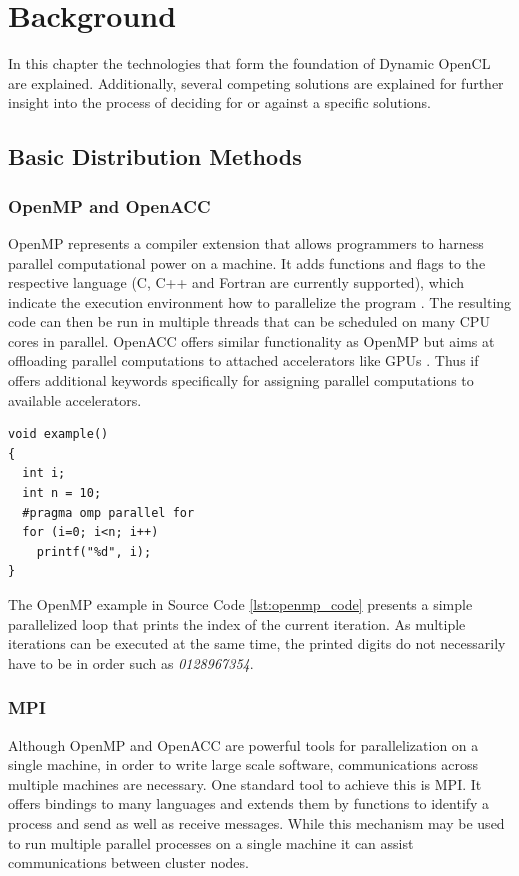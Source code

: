 \chapter{Background}
\label{background}
In this chapter the technologies that form the foundation of Dynamic OpenCL are explained. Additionally, several competing solutions are explained for further insight into the process of deciding for or against a specific solutions.

\section{Basic Distribution Methods}
\label{distribution_basics}

\subsection*{OpenMP and OpenACC}
OpenMP represents a compiler extension that allows programmers to harness parallel computational power on a machine. It adds functions and flags to the respective language (C, C++ and Fortran are currently supported), which indicate the execution environment how to parallelize the program \cite{openmp_spec}. The resulting code can then be run in multiple threads that can be scheduled on many CPU cores in parallel. OpenACC offers similar functionality as OpenMP but aims at offloading parallel computations to attached accelerators like GPUs \cite{openacc_spec}. Thus if offers additional keywords specifically for assigning parallel computations to available accelerators.

\begin{lstlisting}[caption=OpenMP Code Example in C,captionpos=b,label=lst:openmp_code]
void example()
{
  int i;
  int n = 10;
  #pragma omp parallel for
  for (i=0; i<n; i++)
    printf("%d", i);
}
\end{lstlisting}

The OpenMP example in Source Code \ref{lst:openmp_code} presents a simple parallelized loop that prints the index of the current iteration. As multiple iterations can be executed at the same time, the printed digits do not necessarily have to be in order such as \textit{0128967354}. 

\subsection*{MPI}
Although OpenMP and OpenACC are powerful tools for parallelization on a single machine, in order to write large scale software, communications across multiple machines are necessary. One standard tool to achieve this is MPI.
It offers bindings to many languages and extends them by functions to identify a process and send as well as receive messages\cite{mpi_spec}. While this mechanism may be used to run multiple parallel processes on a single machine it can assist communications between cluster nodes.

